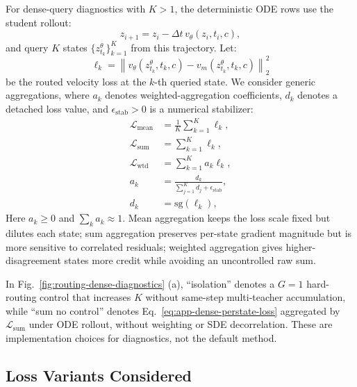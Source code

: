 \documentclass{llmxive}
\begin{document}
For dense-query diagnostics with $K>1$, the deterministic ODE rows use the student rollout:
\begin{equation}
  z_{i+1}=z_i-\Delta t\,v_\theta(z_i,t_i,c),
  \label{eq:app-dense-ode-rollout}
\end{equation}
and query $K$ states $\{z_{t_k}^\theta\}_{k=1}^{K}$ from this trajectory. Let:
\begin{equation}
  \ell_k=\left\|v_\theta(z_{t_k}^\theta,t_k,c)-v_m(z_{t_k}^\theta,t_k,c)\right\|_2^2
  \label{eq:app-dense-perstate-loss}
\end{equation}
be the routed velocity loss at the $k$-th queried state. We consider generic aggregations, where $a_k$ denotes weighted-aggregation coefficients, $d_k$ denotes a detached loss value, and $\epsilon_{\mathrm{stab}}>0$ is a numerical stabilizer:
\begin{align}
  \mathcal{L}_{\mathrm{mean}} &= \frac{1}{K}\sum_{k=1}^{K}\ell_k,\\
  \mathcal{L}_{\mathrm{sum}}  &= \sum_{k=1}^{K}\ell_k,\\
  \mathcal{L}_{\mathrm{wtd}}  &= \sum_{k=1}^{K}a_k\ell_k,\\
  a_k &=\frac{d_k}{\sum_{j=1}^{K}d_j+\epsilon_{\mathrm{stab}}},\\
  d_k &=\mathrm{sg}(\ell_k),
  \label{eq:app-dense-weighted}
\end{align}
Here $a_k\ge0$ and $\sum_k a_k\approx1$. Mean aggregation keeps the loss scale fixed but dilutes each state; sum aggregation preserves per-state gradient magnitude but is more sensitive to correlated residuals; weighted aggregation gives higher-disagreement states more credit while avoiding an uncontrolled raw sum. 

In Fig.~\ref{fig:routing-dense-diagnostics} (a), ``isolation'' denotes a $G{=}1$ hard-routing control that increases $K$ without same-step multi-teacher accumulation, while ``sum no control'' denotes Eq.~\eqref{eq:app-dense-perstate-loss} aggregated by $\mathcal{L}_{\mathrm{sum}}$ under ODE rollout, without weighting or SDE decorrelation. These are implementation choices for diagnostics, not the default method.


\vspace{0.2cm}


\subsection{Loss Variants Considered}
\label{app:loss-variants}
\end{document}
